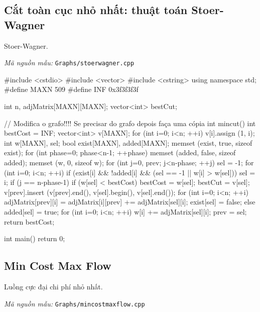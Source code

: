 \documentclass[11pt]{article}
\newcommand{\codepath}[1]{\par\noindent\textit{Mã nguồn mẫu:} \texttt{#1}\par}
\begin{document}
\subsection{Cắt toàn cục nhỏ nhất: thuật toán Stoer-Wagner}

Stoer-Wagner.

\codepath{Graphs/stoerwagner.cpp}

\begingroup\scriptsize
\begin{vncode}
#include <cstdio>
#include <vector>
#include <cstring>
using namespace std;
#define MAXN 509
#define INF 0x3f3f3f3f

int n, adjMatrix[MAXN][MAXN];
vector<int> bestCut;

// Modifica o grafo!!!! Se precisar do grafo depois faça uma cópia
int mincut() {
    int bestCost = INF;
    vector<int> v[MAXN];
    for (int i=0; i<n; ++i)
        v[i].assign (1, i);
    int w[MAXN], sel;
    bool exist[MAXN], added[MAXN];
    memset (exist, true, sizeof exist);
    for (int phase=0; phase<n-1; ++phase) {
        memset (added, false, sizeof added);
        memset (w, 0, sizeof w);
        for (int j=0, prev; j<n-phase; ++j) {
            sel = -1;
            for (int i=0; i<n; ++i) {
                if (exist[i] && !added[i] && (sel == -1 || w[i] > w[sel]))
                    sel = i;
            }
            if (j == n-phase-1) {
                if (w[sel] < bestCost) {
                    bestCost = w[sel];
                    bestCut = v[sel];
                }
                v[prev].insert (v[prev].end(), v[sel].begin(), v[sel].end());
                for (int i=0; i<n; ++i) adjMatrix[prev][i] = adjMatrix[i][prev] += adjMatrix[sel][i];
                exist[sel] = false;
            }
            else {
                added[sel] = true;
                for (int i=0; i<n; ++i)  w[i] += adjMatrix[sel][i];
                prev = sel;
            }
        }
    }
    return bestCost;
}

int main() {
    return 0;
}
\end{vncode}
\endgroup


\subsection{Min Cost Max Flow}

Luồng cực đại chi phí nhỏ nhất.

\codepath{Graphs/mincostmaxflow.cpp}
\end{document}
